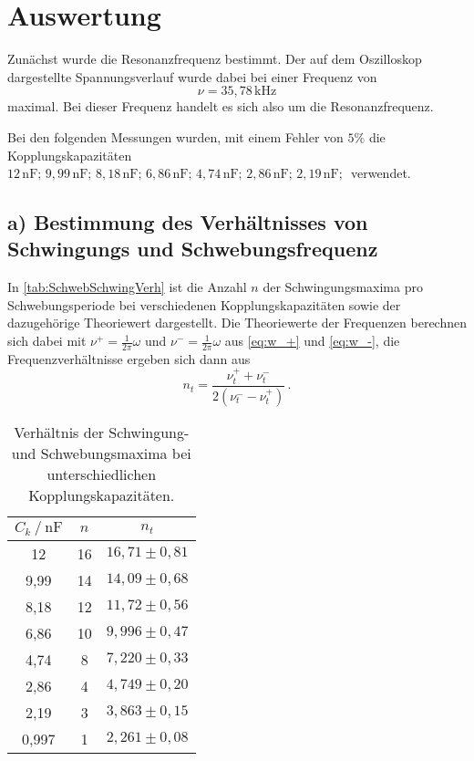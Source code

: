 \section{Auswertung}
\label{sec:Auswertung}


Zunächst wurde die Resonanzfrequenz bestimmt. Der auf dem Oszilloskop dargestellte Spannungsverlauf wurde dabei bei
einer Frequenz von 
\begin{equation*}
    ν = 35,78 \, \unit{\kilo\hertz}
\end{equation*} maximal. Bei dieser Frequenz handelt es sich also um die Resonanzfrequenz.

Bei den folgenden Messungen wurden, mit einem Fehler von $5\%$ die Kopplungskapazitäten $12 \,\unit{\nano\farad};\, 9,99 \,\unit{\nano\farad};\, 
8,18 \,\unit{\nano\farad};\, 6,86 \,\unit{\nano\farad};\, 4,74 \,\unit{\nano\farad};\, 2,86 \,\unit{\nano\farad};\, 2,19 \,\unit{\nano\farad};\,$
verwendet. 

\subsection{a) Bestimmung des Verhältnisses von Schwingungs und Schwebungsfrequenz}
\label{subsec:a}

In \autoref{tab:SchwebSchwingVerh} ist die Anzahl $n$ der Schwingungsmaxima pro Schwebungsperiode bei 
verschiedenen Kopplungskapazitäten sowie der dazugehörige Theoriewert dargestellt.
Die Theoriewerte der Frequenzen berechnen sich dabei mit $ν^+ = \frac{1}{2π}ω$ und $ν^-=\frac{1}{2π}ω$ aus
\eqref{eq:w_+} und \eqref{eq:w_-}, die Frequenzverhältnisse ergeben sich dann aus
\begin{equation*}
    n_t= \frac{ν^+_t + ν^-_t}{2(ν^-_t - ν^+_t)} \,.
\end{equation*}

\begin{table}[H]
    \centering
    \begin{tabular}{S[table-format=1.3] S S[table-format= 2.2]}
        \toprule
        {$C_k \mathbin{/} \unit{\nano\farad}$} & {$n$} & {$n_t$}\\
              &         16  & {$16,71 \pm 0,81$} \\
        9,99       &         14  & {$14,09 \pm 0,68$} \\
        8,18       &         12  & {$11,72 \pm 0,56$} \\
        6,86       &         10  & {$9,996 \pm 0,47$} \\  
        4,74       &          8  & {$7,220 \pm 0,33$} \\
        2,86       &          4  & {$4,749 \pm 0,20$} \\
        2,19       &          3  & {$3,863 \pm 0,15$} \\
        0,997      &          1  & {$2,261 \pm 0,08$} \\
        \bottomrule
    \end{tabular}
    \caption{Verhältnis der Schwingung- und Schwebungsmaxima bei unterschiedlichen Kopplungskapazitäten.}
    \label{tab:SchwebSchwingVerh}
\end{table}

